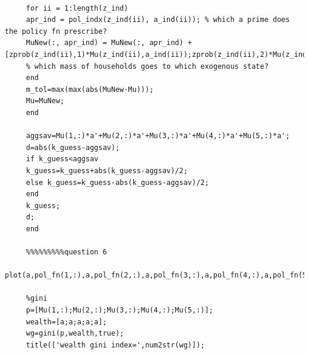 \documentclass[12pt]{article}
\begin{document}
\begin{verbatim}
     
     for ii = 1:length(z_ind)
     apr_ind = pol_indx(z_ind(ii), a_ind(ii)); % which a prime does the policy fn prescribe?
     MuNew(:, apr_ind) = MuNew(:, apr_ind) +[zprob(z_ind(ii),1)*Mu(z_ind(ii),a_ind(ii));zprob(z_ind(ii),2)*Mu(z_ind(ii),a_ind(ii));zprob(z_ind(ii),3)*Mu(z_ind(ii),a_ind(ii));zprob(z_ind(ii),4)*Mu(z_ind(ii),a_ind(ii));zprob(z_ind(ii),5)*Mu(z_ind(ii),a_ind(ii))];
     % which mass of households goes to which exogenous state?
     end
     m_tol=max(max(abs(MuNew-Mu)));
     Mu=MuNew;
     end     
     
     aggsav=Mu(1,:)*a'+Mu(2,:)*a'+Mu(3,:)*a'+Mu(4,:)*a'+Mu(5,:)*a';
     d=abs(k_guess-aggsav);
     if k_guess<aggsav
     k_guess=k_guess+abs(k_guess-aggsav)/2;
     else k_guess=k_guess-abs(k_guess-aggsav)/2;
     end
     k_guess;
     d;
     end
     
     %%%%%%%%%question 6
     plot(a,pol_fn(1,:),a,pol_fn(2,:),a,pol_fn(3,:),a,pol_fn(4,:),a,pol_fn(5,:)),legend('z1','z2','z3','z4','z5');
     
     %gini
     p=[Mu(1,:);Mu(2,:);Mu(3,:);Mu(4,:);Mu(5,:)];
     wealth=[a;a;a;a;a];
     wg=gini(p,wealth,true);
     title(['wealth gini index=',num2str(wg)]);
     
     
     \end{verbatim}


% 
%
\end{document}
